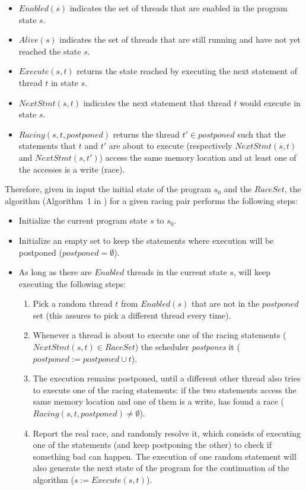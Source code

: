 \begin{refsection}
\begin{itemize}
\item $Enabled(s)$ indicates the set of threads that are enabled in the
  program state $s$.
\item $Alive(s)$ indicates the set of threads that are still running and have
  not yet reached the state $s$.
\item $Execute(s,t)$ returns the state reached by executing the next statement
  of thread $t$ in state $s$.
\item $NextStmt(s,t)$ indicates the next statement that thread $t$ would
  execute in state $s$.
\item $Racing(s,t,postponed)$ returns the thread $t' \in postponed$ such that
  the statements that $t$ and $t'$ are about to execute (respectively
  $NextStmt(s,t)$ and $NextStmt(s,t')$) access the same memory location and at
  least one of the accesses is a write (race).
\end{itemize}

\noindent
Therefore, given in input the initial state of the program $s_0$ and the
$RaceSet$, the \rfuz algorithm (Algorithm~1 in
\cite{Sen:2008:RDR:1375581.1375584}) for a given racing pair performs the
following steps:

\begin{itemize}
\item Initialize the current program state $s$ to $s_0$.
\item Initialize an empty set to keep the statements where execution will be
  postponed ($postponed = \emptyset$).
\item As long as there are $Enabled$ threads in the current state $s$, \rfuz
  will keep executing the following steps:
  \begin{enumerate}
  \item Pick a random thread $t$ from $Enabled(s)$ that are not in the
    $postponed$ set (this assures to pick a different thread every time).
  \item Whenever a thread is about to execute one of the racing statements
    ($NextStmt(s,t) \in RaceSet$) the scheduler \emph{postpones} it
    ($postponed := postponed \cup {t}$).
  \item The execution remains postponed, until a different other thread also
    tries to execute one of the racing statements: if the two statements
    access the same memory location and one of them is a write, \rfuz has
    found a race ($Racing(s,t,postponed) \neq \emptyset$).
  \item Report the real race, and randomly resolve it, which consists of
    executing one of the statements (and keep postponing the other) to check
    if something bad can happen.
    The execution of one random statement will also generate the next state of
    the program for the continuation of the algorithm ($s := Execute(s,t)$).
  \end{enumerate}
\end{itemize}


\end{refsection}
